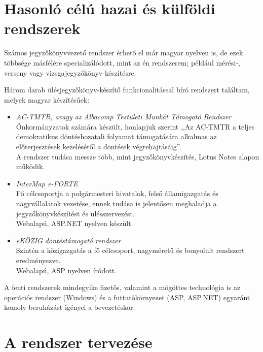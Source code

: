 \documentclass[a4paper,12pt,oneside]{report}
\begin{document}
\section{Hasonló célú hazai és külföldi rendszerek}

Számos jegyzőkönyvvezető rendszer érhető el már magyar nyelven is, de ezek többsége másfélére specializálódott, mint az én rendszerem; például mérési-, verseny vagy vizsgajegyzőkönyv-készítésre.

Három darab ülésjegyzőkönyv-készítő funkcionalitással bíró rendszert találtam, melyek magyar készítésűek:

\begin{itemize}

    \item \emph{AC-TMTR, avagy az Albacomp Testületi Munkát Támogató Rendszer}\cite{website:actmtr}\\
    Önkormányzatok számára készült, honlapjuk szerint ,,Az AC-TMTR a teljes demokratikus döntéshozatali folyamat támogatására alkalmas az előterjesztések kezelésétől a döntések végrehajtásáig''.\\
    A rendszer tudása messze több, mint jegyzőkönyvkészítés, Lotus Notes alapon működik.
    
    \item \emph{InterMap e-FORTE}\cite{website:eforte}\\
    Fő célcsoportja a polgármesteri hivatalok, felső államigazgatás és nagyvállalatok vezetése, ennek tudása is jelentősen meghaladja a jegyzőkönyvkészítést és ülésszervezést.\\
    Webalapú, ASP.NET nyelven készült.
    
    \item \emph{eKÖZIG döntéstámogató rendszer}\cite{website:ekozig}\\
    Szintén a közigazgatás a fő célcsoport, nagyméretű és bonyolult rendszert eredményezve.\\
    Webalapú, ASP nyelven íródott.
    
\end{itemize}

A fenti rendszerek mindegyike fizetős, valamint a mögöttes technológia is \textendash{} az operációs rendszer (Windows) és a futtatókörnyezet (ASP, ASP.NET) egyaránt komoly beruházást igényel a bevezetéskor.


\section{A rendszer tervezése}
\end{document}
